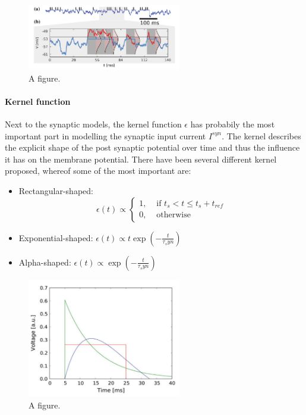 \begin{figure}
	\centering
    	\includegraphics[width=0.6\textwidth]{imgs/hcs.png} 
    \caption{A figure.}
	\label{fig:test}
\end{figure}


\paragraph{Kernel function}

Next to the synaptic models, the kernel function $\epsilon$ has probabily the most important part in modelling the synaptic input current $I^{syn}$. 
The kernel describes the explicit shape of the post synaptic potential over time and thus the influence it has on the membrane potential.
There have been several different kernel proposed, whereof some of the most important are:
\begin{itemize}
\item Rectangular-shaped: \[\epsilon(t) \propto  \begin{cases} 1, & \text{ if } t_{s} < t \le t_{s} + t_{ref} \\ 0, & \text{ otherwise } \end{cases} \]
\item Exponential-shaped: $\epsilon(t) \propto t \exp(- \frac{t}{\tau_syn})$
\item Alpha-shaped: $\epsilon(t) \propto \exp(- \frac{t}{\tau_syn})$
\end{itemize}

\begin{figure}
	\centering
    	\includegraphics[width=0.6\textwidth]{imgs/psp_kernel.png} 
    \caption{A figure.}
	\label{fig:test}
\end{figure}

